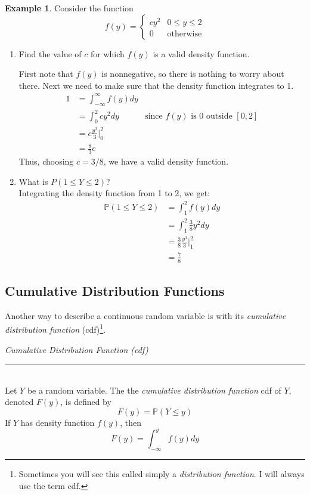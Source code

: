 \documentclass[12pt]{article}
\theoremstyle{definition}
\newtheorem*{example}{Example}
\theoremstyle{remark}
\def\P{{\mathbb P}}
\begin{document}
\begin{example}Consider the function
\[
f(y) = \begin{cases}
cy^2 & 0 \leq y\leq 2\\
0 & \text{otherwise}
\end{cases}
\]
\begin{enumerate}
\item Find the value of $c$ for which $f(y)$ is a valid density function.

First note that $f(y)$ is nonnegative, so there is nothing to worry about there. Next we need to make sure that the density function integrates to 1.
\begin{align*}
1 &= \int_{-\infty}^\infty f(y) dy \\
&= \int_0^2 c y^2 dy &\text{since $f(y)$ is 0 outside $[0, 2]$}\\
&= c\frac{y^3}{3}\Bigr|_0^2 \\
&= \frac{8}{3}c
\end{align*}
Thus, choosing $c = 3/8$, we have a valid density function.

\item What is $P(1 \leq Y \leq 2)$?\\

Integrating the density function from 1 to 2, we get:
\begin{align*}
\P(1 \leq Y \leq 2) &= \int_1^2 f(y) dy \\
&= \int_1^2 \frac{3}{8} y^2 dy \\
&= \frac{3}{8} \frac{y^3}{3} \Bigr|_1^2\\
&= \frac{7}{8}
\end{align*}

\end{enumerate}
\end{example}

\subsection{Cumulative Distribution Functions}
Another way to describe a continuous random variable is with its \emph{cumulative distribution function} (cdf)\footnote{Sometimes you will see this called simply a \emph{distribution function}. I will always use the term cdf.}.\\

\begin{framed}
\emph{Cumulative Distribution Function (cdf)}\\
  \rule{\dimexpr{}\fboxrule}{.1pt} \\
Let $Y$ be a random variable. The the \emph{cumulative distribution function} cdf of $Y$, denoted $F(y)$, is defined by
\[
F(y) = \P(Y \leq y)
\]
If $Y$ has density function $f(y)$, then
\[
F(y) = \int_{-\infty}^y f(y) dy
\]
\end{framed}
\end{document}
